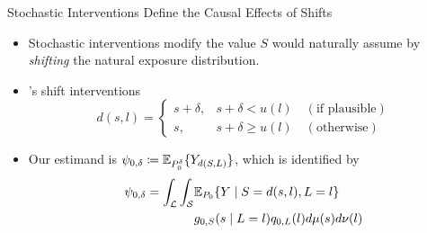 \documentclass{beamer}
\begin{document}
\begin{frame}[c]{Stochastic Interventions Define the Causal Effects of Shifts}

\begin{center}
\begin{itemize}
  \itemsep8pt
  \item Stochastic interventions modify the value $S$ would naturally assume by
    \textit{shifting} the natural exposure distribution.
  \item \cite{diaz2012population, diaz2018stochastic}'s shift
    interventions\footnotemark
     \begin{equation*}\label{shift_intervention}
       d(s, l) =
         \begin{cases}
           s + \delta, & s + \delta < u(l) \quad (\text{if plausible}) \\
           s, & s + \delta \geq u(l) \quad (\text{otherwise})
         \end{cases}
     \end{equation*}
  \item Our estimand is $\psi_{0,\delta} \coloneqq
    \mathbb{E}_{P_0^{\delta}}\{Y_{d(S,L)}\}$, which is identified by
    \begin{align*}\label{eqn:identification2012}
      \psi_{0,\delta} = \int_{\mathcal{L}} \int_{\mathcal{S}} &\mathbb{E}_{P_0}
        \{Y \mid S = d(s, l), L = l\} \\ &g_{0, S}(s \mid L = l)
        q_{0, L}(l) d\mu(s)d\nu(l)
    \end{align*}
\end{itemize}
\end{center}



\end{frame}
\end{document}
